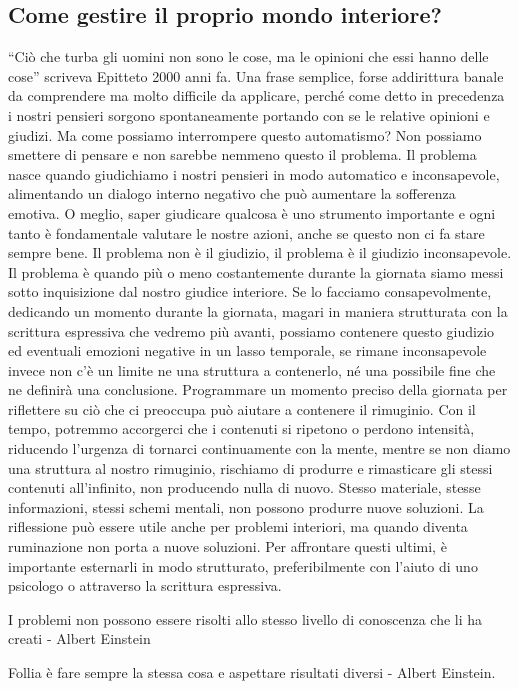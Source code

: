 \documentclass[12pt]{book} %
\begin{document}
\subsection{Come gestire il proprio mondo interiore?}
“Ciò che turba gli uomini non sono le cose, ma le opinioni che essi hanno delle cose” scriveva Epitteto 2000 anni fa.
Una frase semplice, forse addirittura banale da comprendere ma molto difficile da applicare, perché come detto in precedenza i
nostri pensieri sorgono spontaneamente portando con se le relative opinioni e giudizi. Ma come possiamo interrompere
questo automatismo? Non possiamo smettere di pensare e non sarebbe nemmeno questo il problema. 
Il problema nasce quando giudichiamo i nostri pensieri in modo automatico e inconsapevole, alimentando un dialogo interno negativo che può aumentare la sofferenza emotiva. O meglio, saper giudicare qualcosa è uno strumento importante e ogni tanto è
fondamentale valutare le nostre azioni, anche se questo non ci fa stare sempre bene. Il problema non è il giudizio, il
problema è il giudizio inconsapevole. Il problema è quando più o meno costantemente durante la giornata siamo messi
sotto inquisizione dal nostro giudice interiore. Se lo facciamo consapevolmente, dedicando un momento durante la
giornata, magari in maniera strutturata con la scrittura espressiva che vedremo più avanti, possiamo contenere questo
giudizio ed eventuali emozioni negative in un lasso temporale, se rimane inconsapevole invece non
c'è un limite ne una struttura a contenerlo, né una possibile fine che ne definirà una
conclusione. Programmare un momento preciso della giornata per riflettere su ciò che ci preoccupa può aiutare a contenere il rimuginio. Con il tempo, potremmo accorgerci che i contenuti si ripetono o perdono intensità, riducendo l’urgenza di tornarci continuamente con la mente, mentre se non diamo una struttura al nostro rimuginio, rischiamo di produrre
e rimasticare gli stessi contenuti all'infinito, non producendo nulla di nuovo. Stesso materiale,
stesse informazioni, stessi schemi mentali, non possono produrre nuove soluzioni. 
La riflessione può essere utile anche per problemi interiori, ma quando diventa ruminazione non porta a nuove soluzioni. Per affrontare questi ultimi, è importante esternarli in modo strutturato, preferibilmente con l’aiuto di uno psicologo o attraverso la scrittura espressiva.

I problemi non possono essere risolti allo stesso livello di conoscenza che li ha creati - Albert Einstein

Follia è fare sempre la stessa cosa e aspettare risultati diversi - Albert Einstein.
\end{document}
